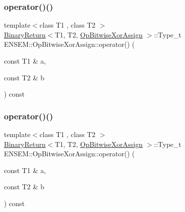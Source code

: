\subsubsection{\texorpdfstring{operator()()}{operator()()}\hspace{0.1cm}{\footnotesize\ttfamily [1/3]}}
{\footnotesize\ttfamily template$<$class T1 , class T2 $>$ \\
\mbox{\hyperlink{structENSEM_1_1BinaryReturn}{Binary\+Return}}$<$T1, T2, \mbox{\hyperlink{structENSEM_1_1OpBitwiseXorAssign}{Op\+Bitwise\+Xor\+Assign}} $>$\+::Type\+\_\+t E\+N\+S\+E\+M\+::\+Op\+Bitwise\+Xor\+Assign\+::operator() (\begin{DoxyParamCaption}\item[{const T1 \&}]{a,  }\item[{const T2 \&}]{b }\end{DoxyParamCaption}) const\hspace{0.3cm}{\ttfamily [inline]}}

\mbox{\label{structENSEM_1_1OpBitwiseXorAssign_a4052fafdb4677ce5a429ae23383ed469}} 
\subsubsection{\texorpdfstring{operator()()}{operator()()}\hspace{0.1cm}{\footnotesize\ttfamily [2/3]}}
{\footnotesize\ttfamily template$<$class T1 , class T2 $>$ \\
\mbox{\hyperlink{structENSEM_1_1BinaryReturn}{Binary\+Return}}$<$T1, T2, \mbox{\hyperlink{structENSEM_1_1OpBitwiseXorAssign}{Op\+Bitwise\+Xor\+Assign}} $>$\+::Type\+\_\+t E\+N\+S\+E\+M\+::\+Op\+Bitwise\+Xor\+Assign\+::operator() (\begin{DoxyParamCaption}\item[{const T1 \&}]{a,  }\item[{const T2 \&}]{b }\end{DoxyParamCaption}) const\hspace{0.3cm}{\ttfamily [inline]}}

\mbox{\label{structENSEM_1_1OpBitwiseXorAssign_a4052fafdb4677ce5a429ae23383ed469}} 
